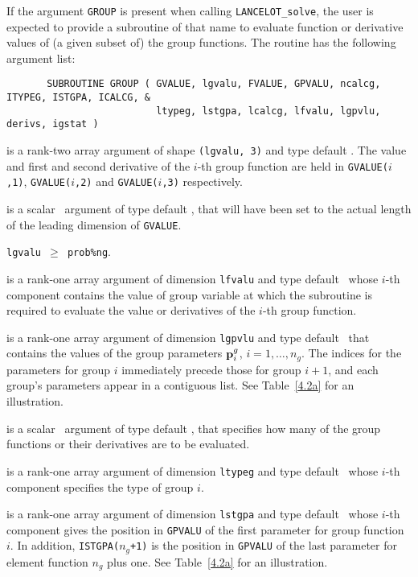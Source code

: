 \documentclass{galahad}
\newcommand{\fullpackagename}{LANC\-E\-LOT}
\newcommand{\solver}{{\tt \fullpackagename\_solve}}
\begin{document}
If the argument {\tt GROUP} is present when calling \solver, the
user is expected to provide a subroutine of that name to evaluate
function or derivative values of (a given subset of) the group functions.
The routine has the following argument list:

\def\baselinestretch{0.8}
{\tt \begin{verbatim}
       SUBROUTINE GROUP ( GVALUE, lgvalu, FVALUE, GPVALU, ncalcg, ITYPEG, ISTGPA, ICALCG, &
                          ltypeg, lstgpa, lcalcg, lfvalu, lgpvlu, derivs, igstat )
\end{verbatim} }
\def\baselinestretch{1.0}

\begin{description}

 is a rank-two \intentout array argument of
shape {\tt (lgvalu, 3)} and type default \realdp.
The value and first and second derivative of the $i$-th group
function are held in
{\tt GVALUE($i$,1)},
{\tt GVALUE($i$,2)} and
{\tt GVALUE($i$,3)}
respectively.

 is a scalar \intentin\ argument of type default \integer,
that will have been set to the actual length of the leading dimension
of {\tt GVALUE}.

\restriction
{\tt lgvalu $\geq$ prob\%ng}.

 is a rank-one \intentin array argument of
dimension {\tt lfvalu} and type default \realdp\,
whose $i$-th component contains the value of group variable at which the
subroutine is required to evaluate the value or derivatives
of the $i$-th group function.

 is a rank-one \intentin array argument of
dimension {\tt lgpvlu}  and type default \realdp\,
that contains the values of the group parameters ${\mathbf{p}}^g_i$, $i = 1, \ldots,
n_g$. The indices for the parameters for group $i$ immediately precede
those for group $i+1$, and each group's parameters appear in a contiguous
list. See Table~\ref{4.2a} for an illustration.

 is a scalar \intentin\ argument of type default \integer,
that specifies how many of the group functions or their
derivatives are to be evaluated.

 is a rank-one \intentin array argument of
dimension {\tt ltypeg} and type default \integer\,
whose $i$-th component specifies the type of group $i$.

 is a rank-one \intentin array argument of
dimension {\tt lstgpa} and type default \integer\,
whose $i$-th component gives the position in
{\tt GPVALU} of the first parameter for group function $i$.  In
addition, {\tt ISTGPA($n_g$+1)} is the position in
{\tt GPVALU} of the last  parameter for element function $n_g$ plus one. See
Table~\ref{4.2a} for an illustration.


\end{description}
\end{document}
